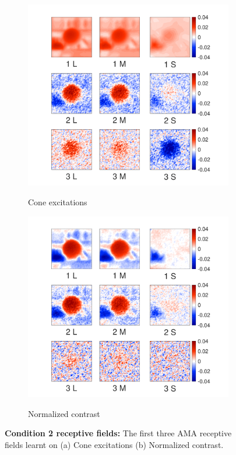 \documentclass[10pt,english]{article}
\begin{document}
\begin{figure}
\centering
    \begin{subfigure}[b]{0.4 \textwidth}
	\caption{Cone excitations}
	\includegraphics[width=1.0\textwidth, trim={0.2cm -0.cm 0 0.3cm}]{../FiguresDraft5/FigureSI/SI_Figure1_a.pdf}
	\label{fig:case1RFs}
    \end{subfigure}   
    \begin{subfigure}[b]{0.4 \textwidth}
	\caption{Normalized contrast}
	\includegraphics[width=1.0\textwidth, trim={0.2cm -0.cm 0 0.3cm}]{../FiguresDraft5/FigureSI/SI_Figure1_b.pdf}
	\label{fig:case1RFs}
    \end{subfigure}   
    \caption{{\bf Condition 2 receptive fields:} The first three AMA receptive fields learnt on (a) Cone excitations (b) Normalized contrast.}
\label{fig:Condition1}
\end{figure}





\end{document}
